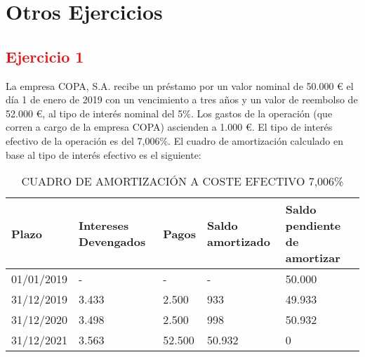 \section{Otros Ejercicios}

\subsection*{\textcolor{red}{Ejercicio 1}}

La empresa COPA, S.A. recibe un préstamo por un valor nominal de 50.000 € el día 1 de enero de 2019 con un vencimiento a tres años y un valor de reembolso de 52.000 €, al tipo de interés nominal del 5\%. Los gastos de la operación (que corren a cargo de la empresa COPA) ascienden a 1.000 €. El tipo de interés efectivo de la operación es del 7,006\%. El cuadro de amortización calculado en base al tipo de interés efectivo es el siguiente:

\begin{table}[h!]
\centering
\begin{tabular}{|p{2cm}|p{3cm}|p{2cm}|p{3cm}|p{3cm}|}
\hline
\textbf{Plazo} & \textbf{Intereses Devengados} & \textbf{Pagos} & \textbf{Saldo amortizado} & \textbf{Saldo pendiente de amortizar} \\ \hline
01/01/2019 & - & - & - & 50.000 \\ \hline
31/12/2019 & 3.433 & 2.500 & 933 & 49.933 \\ \hline
31/12/2020 & 3.498 & 2.500 & 998 & 50.932 \\ \hline
31/12/2021 & 3.563 & 52.500 & 50.932 & 0 \\ \hline
\end{tabular}
\caption{CUADRO DE AMORTIZACIÓN A COSTE EFECTIVO 7,006\%}
\end{table}


